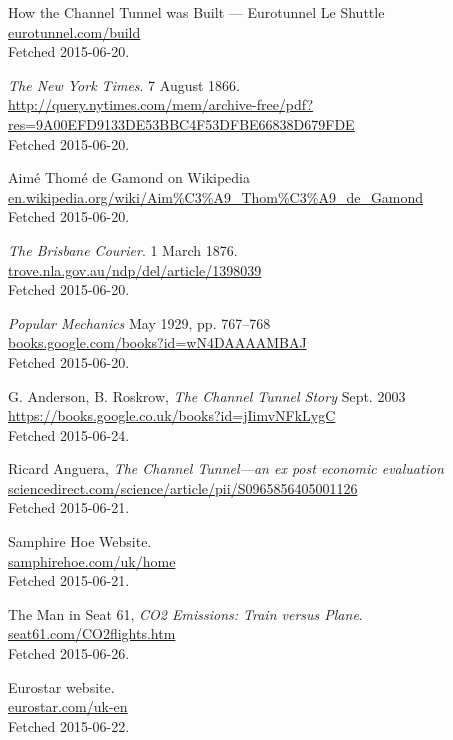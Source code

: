 \documentclass[12pt]{article} %
\begin{document}
\begin{thebibliography}{99}

	How the Channel Tunnel was Built --- Eurotunnel Le Shuttle\\
	\url{eurotunnel.com/build}\\
	Fetched 2015-06-20.

	\textit{The New York Times}. 7 August 1866.\\
	\url{http://query.nytimes.com/mem/archive-free/pdf?res=9A00EFD9133DE53BBC4F53DFBE66838D679FDE}\\
	Fetched 2015-06-20.

	Aimé Thomé de Gamond on Wikipedia\\
	\url{en.wikipedia.org/wiki/Aim%C3%A9_Thom%C3%A9_de_Gamond}\\
	Fetched 2015-06-20.

	\textit{The Brisbane Courier}. 1 March 1876.\\
	\url{trove.nla.gov.au/ndp/del/article/1398039}\\
	Fetched 2015-06-20.

	\emph{Popular Mechanics} May 1929, pp. 767--768\\
	\url{books.google.com/books?id=wN4DAAAAMBAJ}\\
	Fetched 2015-06-20.

	G. Anderson, B. Roskrow, \emph{The Channel Tunnel Story} Sept. 2003\\
	\url{https://books.google.co.uk/books?id=jIimvNFkLygC}\\
	Fetched 2015-06-24.

	Ricard Anguera, \textit{The Channel Tunnel---an ex post economic evaluation}\\
	\url{sciencedirect.com/science/article/pii/S0965856405001126}\\
	Fetched 2015-06-21.

	Samphire Hoe Website.\\
	\url{samphirehoe.com/uk/home}\\
	Fetched 2015-06-21.

	The Man in Seat 61, \textit{CO2 Emissions: Train versus Plane}.\\
	\url{seat61.com/CO2flights.htm}\\
	Fetched 2015-06-26.

	Eurostar website.\\
	\url{eurostar.com/uk-en}\\
	Fetched 2015-06-22.
	

\end{thebibliography}
\end{document}
